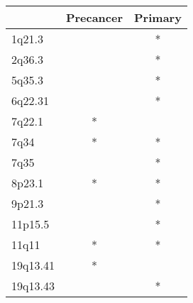 \begin{tabular}{lcc}
\toprule
{} & Precancer & Primary \\
\midrule
1q21.3   &           &       * \\
2q36.3   &           &       * \\
5q35.3   &           &       * \\
6q22.31  &           &       * \\
7q22.1   &         * &         \\
7q34     &         * &       * \\
7q35     &           &       * \\
8p23.1   &         * &       * \\
9p21.3   &           &       * \\
11p15.5  &           &       * \\
11q11    &         * &       * \\
19q13.41 &         * &         \\
19q13.43 &           &       * \\
\bottomrule
\end{tabular}
